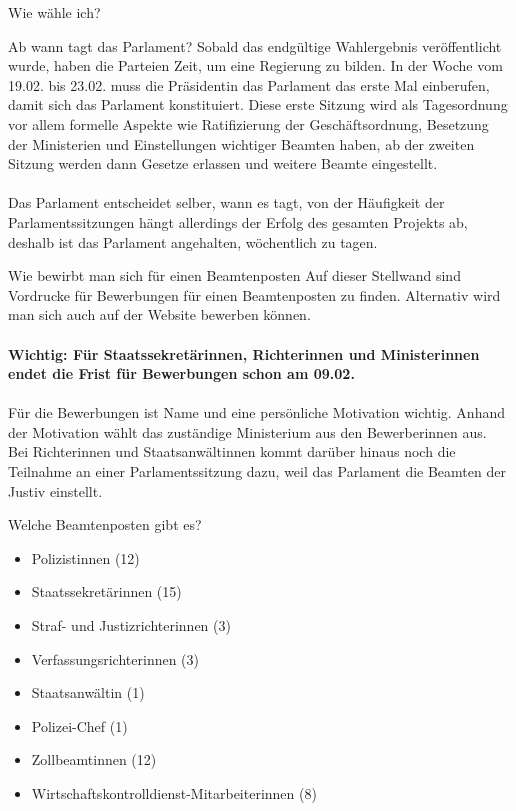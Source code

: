 \documentclass{sasbase}
\begin{document}
\begin{question}{Wie wähle ich?}
\begin{question}{Ab wann tagt das Parlament?}
    Sobald das endgültige Wahlergebnis veröffentlicht wurde, haben die Parteien Zeit, um eine Regierung zu bilden. 
    In der Woche vom 19.02. bis 23.02. muss die Präsidentin das Parlament das erste Mal einberufen, damit sich das Parlament konstituiert.
    Diese erste Sitzung wird als Tagesordnung vor allem formelle Aspekte wie Ratifizierung der Geschäftsordnung, Besetzung der Ministerien und Einstellungen wichtiger Beamten haben, 
    ab der zweiten Sitzung werden dann Gesetze erlassen und weitere Beamte eingestellt.
    \\
    \\
    Das Parlament entscheidet selber, wann es tagt, von der Häufigkeit der Parlamentssitzungen hängt allerdings der Erfolg des gesamten Projekts ab, deshalb
    ist das Parlament angehalten, wöchentlich zu tagen.
    
\end{question}
\begin{question}{Wie bewirbt man sich für einen Beamtenposten}
    Auf dieser Stellwand sind Vordrucke für Bewerbungen für einen Beamtenposten zu finden. Alternativ wird man sich auch auf der Website bewerben können.\\\\
    \textbf{Wichtig: Für Staatssekretärinnen, Richterinnen und Ministerinnen endet die Frist für Bewerbungen schon am 09.02.} \\\\Für die Bewerbungen ist Name und eine persönliche Motivation wichtig. Anhand der Motivation
    wählt das zuständige Ministerium aus den Bewerberinnen aus. \\
    Bei Richterinnen und Staatsanwältinnen kommt darüber hinaus noch die Teilnahme an einer Parlamentssitzung dazu, weil das Parlament die Beamten der Justiv einstellt.
\end{question}

\begin{question}{Welche Beamtenposten gibt es?}
\begin{itemize}
        \item Polizistinnen (12)
        \item Staatssekretärinnen (15)
        \item Straf- und Justizrichterinnen (3)
        \item Verfassungsrichterinnen (3)
        \item Staatsanwältin (1)
        \item Polizei-Chef (1)
        \item Zollbeamtinnen (12)
        \item Wirtschaftskontrolldienst-Mitarbeiterinnen (8)
    \end{itemize}
\end{question}


\end{question}
\end{document}
